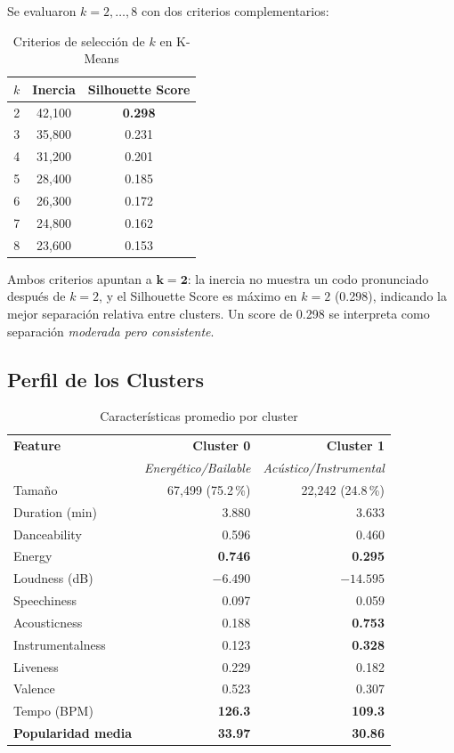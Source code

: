 \documentclass[12pt,a4paper]{article}
\begin{document}
Se evaluaron $k = 2, \ldots, 8$ con dos criterios complementarios:

\begin{table}[H]
\centering
\caption{Criterios de selecci\'on de $k$ en K-Means}
\begin{tabular}{ccc}
\toprule
$k$ & Inercia & Silhouette Score \\
\midrule
2 & 42{,}100 & \textbf{0.298} \\
3 & 35{,}800 & 0.231 \\
4 & 31{,}200 & 0.201 \\
5 & 28{,}400 & 0.185 \\
6 & 26{,}300 & 0.172 \\
7 & 24{,}800 & 0.162 \\
8 & 23{,}600 & 0.153 \\
\bottomrule
\end{tabular}
\end{table}

Ambos criterios apuntan a $\mathbf{k=2}$: la inercia no muestra un codo pronunciado
despu\'es de $k=2$, y el Silhouette Score es m\'aximo en $k=2$ (0.298), indicando la
mejor separaci\'on relativa entre clusters. Un score de 0.298 se interpreta como
separaci\'on \emph{moderada pero consistente}.

\subsection{Perfil de los Clusters}

\begin{table}[H]
\centering
\caption{Caracter\'isticas promedio por cluster}
\begin{tabular}{lrr}
\toprule
\textbf{Feature} & \textbf{Cluster 0} & \textbf{Cluster 1} \\
                 & \textit{Energ\'etico/Bailable} & \textit{Ac\'ustico/Instrumental} \\
\midrule
Tama\~no          & 67{,}499 (75.2\,\%) & 22{,}242 (24.8\,\%) \\
\midrule
Duration (min)   & 3.880               & 3.633 \\
Danceability     & 0.596               & 0.460 \\
Energy           & \textbf{0.746}      & \textbf{0.295} \\
Loudness (dB)    & $-6.490$            & $-14.595$ \\
Speechiness      & 0.097               & 0.059 \\
Acousticness     & 0.188               & \textbf{0.753} \\
Instrumentalness & 0.123               & \textbf{0.328} \\
Liveness         & 0.229               & 0.182 \\
Valence          & 0.523               & 0.307 \\
Tempo (BPM)      & \textbf{126.3}      & \textbf{109.3} \\
\midrule
\textbf{Popularidad media} & \textbf{33.97} & \textbf{30.86} \\
\bottomrule
\end{tabular}
\end{table}
\end{document}
